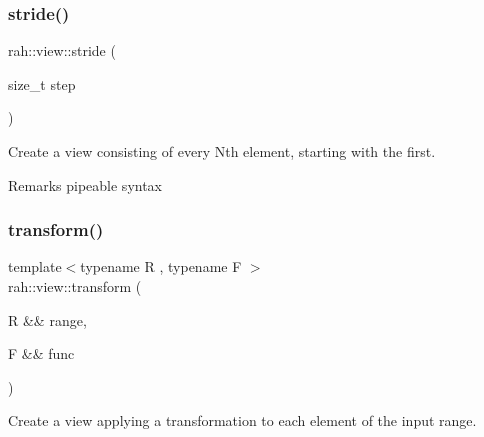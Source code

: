 \subsubsection{\texorpdfstring{stride()}{stride()}\hspace{0.1cm}{\footnotesize\ttfamily [2/2]}}
{\footnotesize\ttfamily rah\+::view\+::stride (\begin{DoxyParamCaption}\item[{size\+\_\+t}]{step }\end{DoxyParamCaption})}



Create a view consisting of every Nth element, starting with the first. 

\begin{DoxyRemark}{Remarks}
pipeable syntax 
\begin{DoxyCodeInclude}{0}
\end{DoxyCodeInclude}

\end{DoxyRemark}
\mbox{\label{namespacerah_1_1view_a73d98aff6def51242231b9ec440dd026}} 
\subsubsection{\texorpdfstring{transform()}{transform()}\hspace{0.1cm}{\footnotesize\ttfamily [1/2]}}
{\footnotesize\ttfamily template$<$typename R , typename F $>$ \\
rah\+::view\+::transform (\begin{DoxyParamCaption}\item[{R \&\&}]{range,  }\item[{F \&\&}]{func }\end{DoxyParamCaption})}



Create a view applying a transformation to each element of the input range. 


